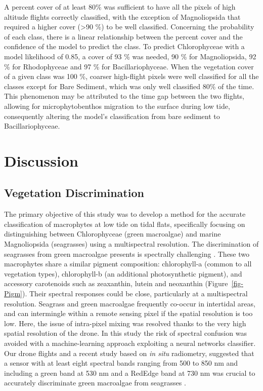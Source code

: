 \documentclass[
  number]{elsarticle}
\begin{document}
A percent cover of at least 80\% was sufficient to have all the pixels
of high altitude flights correctly classified, with the exception of
Magnoliopsida that required a higher cover (\textgreater90 \%) to be
well classified. Concerning the probability of each class, there is a
linear relationship between the percent cover and the confidence of the
model to predict the class. To predict Chlorophyceae with a model
likelihood of 0.85, a cover of 93 \% was needed, 90 \% for
Magnoliopsida, 92 \% for Rhodophyceae and 97 \% for Bacillariophyceae.
When the vegetation cover of a given class was 100 \%, coarser
high-flight pixels were well classified for all the classes except for
Bare Sediment, which was only well classified 80\% of the time. This
phenomenon may be attributed to the time gap between the two flights,
allowing for microphytobenthos migration to the surface during low tide,
consequently altering the model's classification from bare sediment to
Bacillariophyceae.

\section{Discussion}\label{discussion}

\subsection{Vegetation Discrimination}\label{vegetation-discrimination}

The primary objective of this study was to develop a method for the
accurate classification of macrophytes at low tide on tidal flats,
specifically focusing on distinguishing between Chlorophyceae (green
macroalgae) and marine Magnoliopsida (seagrasses) using a multispectral
resolution. The discrimination of seagrasses from green macroalgae
presents is spectrally challenging \citetext{\citealp[
]{oiry2021using}; \citealp[
]{bannari2022}; \citealp{veettil2020opportunities}}. These two
macrophytes share a similar pigment composition: chlorophyll-a (common
to all vegetation types), chlorophyll-b (an additional photosynthetic
pigment), and accessory carotenoids such as zeaxanthin, lutein and
neoxanthin (Figure~\ref{fig-Pigm}). Their spectral responses could be
close, particularly at a multispectral resolution. Seagrass and green
macroalgae frequently co-occur in intertidal areas, and can intermingle
within a remote sensing pixel if the spatial resolution is too low.
Here, the issue of intra-pixel mixing was resolved thanks to the very
high spatial resolution of the drone. In this study the risk of spectral
confusion was avoided with a machine-learning approach exploiting a
neural networks classifier. Our drone flights and a recent study based
on \emph{in situ} radiometry, suggested that a sensor with at least
eight spectral bands ranging from 500 to 850 nm and including a green
band at 530 nm and a RedEdge band at 730 nm was crucial to accurately
discriminate green macroalgae from seagrasses \citep{Davies2023}.
\end{document}
